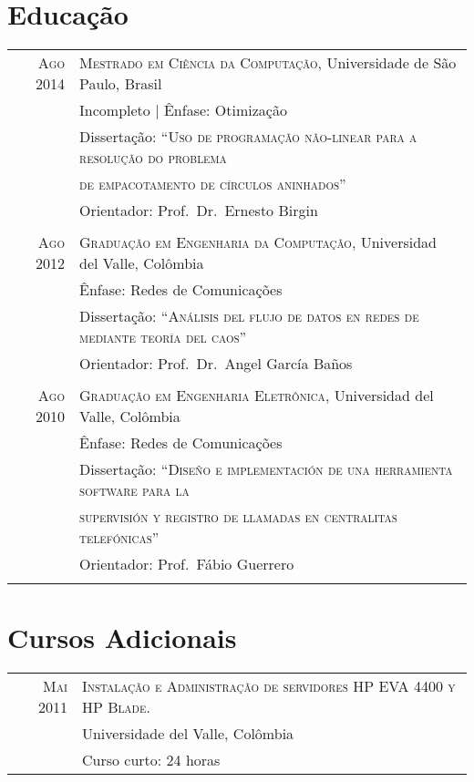 \documentclass[a4paper,10pt]{article}
\begin{document}
\section{Educação}
\begin{tabular}{rl}	

  \textsc{Ago 2014} & \textsc{Mestrado em Ciência da Computação}, Universidade de São Paulo, Brasil \\
                    & Incompleto | Ênfase: Otimização \\
                    & Dissertação: ``\textsc{Uso de programação não-linear para a resolução do problema}\\
                    & \textsc{de empacotamento de círculos aninhados}'' \\
                    & Orientador: Prof.~Dr.~Ernesto Birgin \\
                    &\\

  \textsc{Ago 2012} & \textsc{Graduação em Engenharia da Computação}, Universidad del Valle, Colômbia \\
                    & Ênfase: Redes de Comunicações \\
                    & Dissertação: ``\textsc{Análisis del flujo de datos en redes de mediante teoría del caos}'' \\
                    & Orientador: Prof.~Dr.~Angel García Baños \\
                    &\\

  \textsc{Ago 2010} & \textsc{Graduação em Engenharia Eletrônica}, Universidad del Valle, Colômbia \\
                    & Ênfase: Redes de Comunicações \\
                    & Dissertação: ``\textsc{Diseño e implementación de una herramienta software para la} \\
                    & \textsc{supervisión y registro de llamadas en centralitas telefónicas}'' \\
                    & Orientador: Prof.~Fábio Guerrero \\
                    &\\

\end{tabular}

\section{Cursos Adicionais}
\begin{tabular}{rl}	

  \textsc{Mai 2011} & \textsc{Instalação e Administração de servidores HP EVA 4400 y HP Blade.} \\
                    & Universidade del Valle, Colômbia \\
                    & Curso curto: 24 horas \\

\end{tabular}
\end{document}
